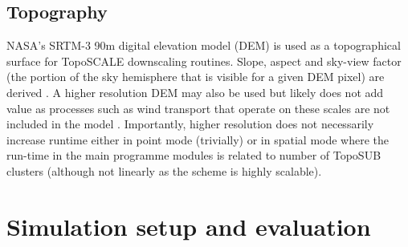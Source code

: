 \documentclass[hess, manuscript]{copernicus}
\begin{document}
\subsection{Topography}
NASA's SRTM-3 90\unit{m} digital elevation model (DEM) is used as a topographical surface for TopoSCALE downscaling routines. Slope, aspect and sky-view factor (the portion of the sky hemisphere that is visible for a given DEM pixel) are derived \citep{Dozier1990-jp}. A higher resolution DEM may also be used but likely does not add value as processes such as wind transport that operate on these scales are not included in the model \citep{Mott2018-pt}. Importantly, higher resolution does not necessarily increase runtime either in point mode (trivially) or in spatial mode where the run-time in the main programme modules is related to number of TopoSUB clusters (although not linearly as the scheme is highly scalable).



\section{Simulation setup and evaluation}
\end{document}
